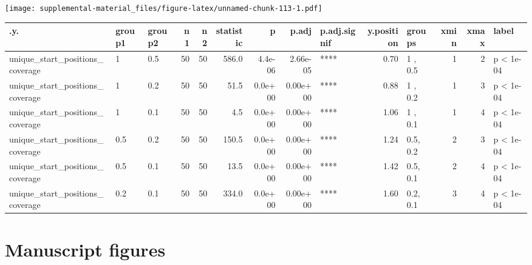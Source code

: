 \documentclass[]{book}
\begin{document}
\texttt{[image: supplemental-material\_files/figure-latex/unnamed-chunk-113-1.pdf]}

\begin{tabular}{l|l|l|r|r|r|r|r|l|r|l|r|r|l}
\hline
.y. & group1 & group2 & n1 & n2 & statistic & p & p.adj & p.adj.signif & y.position & groups & xmin & xmax & label\\
\hline
unique\_start\_positions\_coverage & 1 & 0.5 & 50 & 50 & 586.0 & 4.4e-06 & 2.66e-05 & **** & 0.70 & 1  , 0.5 & 1 & 2 & p < 1e-04\\
\hline
unique\_start\_positions\_coverage & 1 & 0.2 & 50 & 50 & 51.5 & 0.0e+00 & 0.00e+00 & **** & 0.88 & 1  , 0.2 & 1 & 3 & p < 1e-04\\
\hline
unique\_start\_positions\_coverage & 1 & 0.1 & 50 & 50 & 4.5 & 0.0e+00 & 0.00e+00 & **** & 1.06 & 1  , 0.1 & 1 & 4 & p < 1e-04\\
\hline
unique\_start\_positions\_coverage & 0.5 & 0.2 & 50 & 50 & 150.5 & 0.0e+00 & 0.00e+00 & **** & 1.24 & 0.5, 0.2 & 2 & 3 & p < 1e-04\\
\hline
unique\_start\_positions\_coverage & 0.5 & 0.1 & 50 & 50 & 13.5 & 0.0e+00 & 0.00e+00 & **** & 1.42 & 0.5, 0.1 & 2 & 4 & p < 1e-04\\
\hline
unique\_start\_positions\_coverage & 0.2 & 0.1 & 50 & 50 & 334.0 & 0.0e+00 & 0.00e+00 & **** & 1.60 & 0.2, 0.1 & 3 & 4 & p < 1e-04\\
\hline
\end{tabular}

\hypertarget{manuscript-figures-9}{%
\section{Manuscript figures}\label{manuscript-figures-9}}
\end{document}
